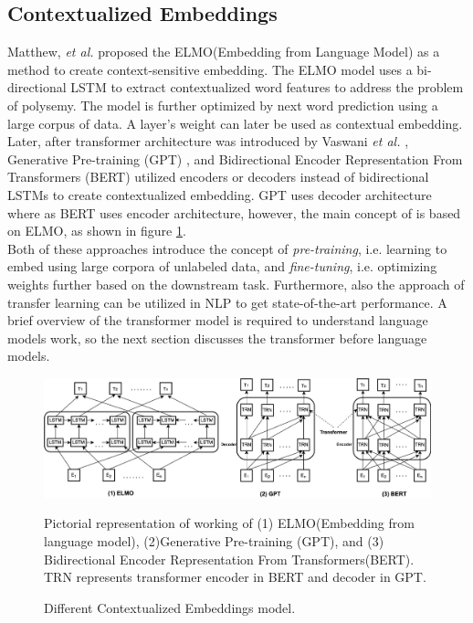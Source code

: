 \documentclass[%
	BCOR=8mm, %
	DIV=12,
	toc=bibliography, %
	toc=listof, %
	oneside, %
	egregdoesnotlikesansseriftitles, %
	]{scrbook}
\begin{document}
 \subsection{Contextualized Embeddings}
 \label{subsection:contextembeddings}
 Matthew, \textit{et al.} \cite{peters_deep_2018-3} proposed the ELMO(Embedding from Language Model) as a method to create context-sensitive embedding. The ELMO model uses a bi-directional LSTM to extract contextualized word features to address the problem of polysemy. The model is further optimized by next word prediction using a large corpus of data. A layer's weight can later be used as contextual embedding. \\
 Later, after transformer architecture was introduced by  Vaswani \textit{et al.} \cite{vaswani_attention_2017}, Generative Pre-training (GPT) \cite{radford_improving_nodate}, and Bidirectional Encoder Representation From Transformers (BERT) \cite{devlin_bert_2019-1} utilized  encoders or decoders instead of bidirectional LSTMs to create contextualized embedding. GPT uses decoder architecture where as BERT uses encoder architecture, however, the main concept of is based on ELMO, as shown in figure \ref{fig:elmo}. \\
 Both of these approaches introduce the concept of \textit{pre-training}, i.e. learning to embed using large corpora of unlabeled data, and \textit{fine-tuning}, i.e. optimizing weights further based on the downstream task. Furthermore, also the approach of transfer learning can be utilized in NLP to get state-of-the-art performance. A brief overview of the transformer model is required to understand language models work, so the next section discusses the transformer before language models.

\begin{figure}[h!]
    \centering
    \includegraphics[width=1.0\linewidth]{img/elmo}
    \caption{Different Contextualized Embeddings model.}{Pictorial representation of working of (1) ELMO(Embedding from language model),  (2)Generative Pre-training (GPT), and (3) Bidirectional Encoder Representation From Transformers(BERT). TRN represents transformer encoder in BERT and decoder in GPT.}
    \label{fig:elmo}
\end{figure}
\end{document}
